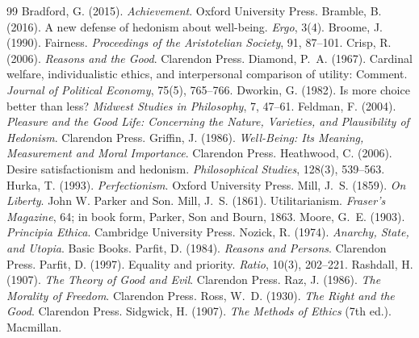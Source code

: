 \documentclass{situationist-preprint}
\begin{document}
\begin{thebibliography}{99}\small
{} Bradford, G. (2015). \emph{Achievement}. Oxford University Press.
 Bramble, B. (2016). A new defense of hedonism about well-being. \emph{Ergo}, 3(4).
 Broome, J. (1990). Fairness. \emph{Proceedings of the Aristotelian Society}, 91, 87--101.
 Crisp, R. (2006). \emph{Reasons and the Good}. Clarendon Press.
 Diamond, P.~A. (1967). Cardinal welfare, individualistic ethics, and interpersonal comparison of utility: Comment. \emph{Journal of Political Economy}, 75(5), 765--766.
 Dworkin, G. (1982). Is more choice better than less? \emph{Midwest Studies in Philosophy}, 7, 47--61.
 Feldman, F. (2004). \emph{Pleasure and the Good Life: Concerning the Nature, Varieties, and Plausibility of Hedonism}. Clarendon Press.
 Griffin, J. (1986). \emph{Well-Being: Its Meaning, Measurement and Moral Importance}. Clarendon Press.
 Heathwood, C. (2006). Desire satisfactionism and hedonism. \emph{Philosophical Studies}, 128(3), 539--563.
 Hurka, T. (1993). \emph{Perfectionism}. Oxford University Press.
 Mill, J.~S. (1859). \emph{On Liberty}. John W. Parker and Son.
 Mill, J.~S. (1861). Utilitarianism. \emph{Fraser's Magazine}, 64; in book form, Parker, Son and Bourn, 1863.
 Moore, G.~E. (1903). \emph{Principia Ethica}. Cambridge University Press.
 Nozick, R. (1974). \emph{Anarchy, State, and Utopia}. Basic Books.
 Parfit, D. (1984). \emph{Reasons and Persons}. Clarendon Press.
 Parfit, D. (1997). Equality and priority. \emph{Ratio}, 10(3), 202--221.
 Rashdall, H. (1907). \emph{The Theory of Good and Evil}. Clarendon Press.
 Raz, J. (1986). \emph{The Morality of Freedom}. Clarendon Press.
 Ross, W.~D. (1930). \emph{The Right and the Good}. Clarendon Press.
 Sidgwick, H. (1907). \emph{The Methods of Ethics} (7th ed.). Macmillan.
\end{thebibliography}
\end{document}
